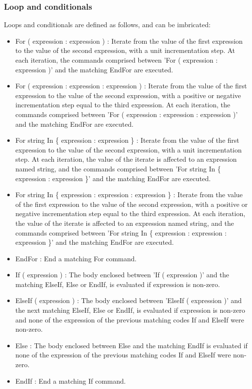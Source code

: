 \documentclass[dvipdfmx, 9pt, a4paper]{article}
\numberwithin{equation}{section}
\begin{document}
\subsubsection{Loop and conditionals}
Loops and conditionals are defined as follows, and can be imbricated:
\begin{itemize}
\item For ( expression : expression ) : Iterate from the value of the first expression to the value of the second expression,
with a unit incrementation step. At each iteration, the commands comprised between 'For ( expression : expression )' and the matching EndFor are executed.
\item For ( expression : expression : expression ) : Iterate from the value of the first expression to the value of the second expression,
with a positive or negative incrementation step equal to the third expression. At each iteration, the commands comprised between 'For ( expression : expression : expression )' and the matching EndFor are executed.
\item For string In \{ expression : expression \} : Iterate from the value of the first expression to the value of the second expression, with a unit incrementation step. At each iteration, the value of the iterate is affected to an expression named string, and the commands comprised between 'For string In \{ expression : expression \}' and the matching EndFor are executed.
\item For string In \{ expression : expression : expression \} : Iterate from the value of the first expression to the value of the second expression, with a positive or negative incrementation step equal to the third expression. At each iteration, the value of the iterate is affected to an expression named string, and the commands comprised between 'For string In \{ expression : expression : expression \}' and the matching EndFor are executed.
\item EndFor : End a matching For command.
\item If ( expression ) : The body enclosed between 'If ( expression )' and the matching ElseIf, Else or EndIf, is evaluated if expression is non-zero.
\item ElseIf ( expression ) : The body enclosed between 'ElseIf ( expression )' and the next matching ElseIf, Else or EndIf, is evaluated if expression is non-zero and none of the expression of the previous matching codes If and ElseIf were non-zero.
\item Else : The body enclosed between Else and the matching EndIf is evaluated if none of the expression of the previous matching codes If and ElseIf were non-zero.
\item EndIf : End a matching If command.
\end{itemize}
\end{document}
